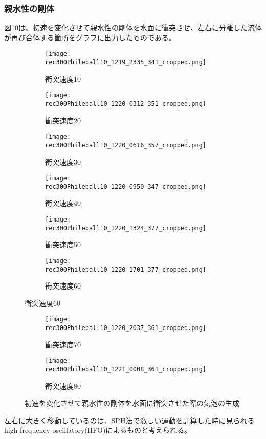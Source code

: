 \documentclass[]{jsarticle}
\begin{document}
\subsubsection{親水性の剛体}
図\ref{fig:hydrophilic}は、初速を変化させて親水性の剛体を水面に衝突させ、左右に分離した流体が再び合体する箇所をグラフに出力したものである。
\begin{figure}[H]
  \centering
\begin{subfigure}{0.3\columnwidth}
  \centering
  \texttt{[image: rec300Phileball10\_1219\_2335\_341\_cropped.png]}
  \caption{衝突速度10}
  \label{fig:philevel10}
\end{subfigure}
\begin{subfigure}{0.3\columnwidth}
  \centering
  \texttt{[image: rec300Phileball10\_1220\_0312\_351\_cropped.png]}
  \caption{衝突速度20}
  \label{fig:philevel20}
\end{subfigure}
\begin{subfigure}{0.3\columnwidth}
  \centering
  \texttt{[image: rec300Phileball10\_1220\_0616\_357\_cropped.png]}
  \caption{衝突速度30}
  \label{fig:philevel30}
\end{subfigure}
\begin{subfigure}{0.3\columnwidth}
  \centering
  \texttt{[image: rec300Phileball10\_1220\_0950\_347\_cropped.png]}
  \caption{衝突速度40}
  \label{fig:philevel40}
\end{subfigure}
\begin{subfigure}{0.3\columnwidth}
  \centering
  \texttt{[image: rec300Phileball10\_1220\_1324\_377\_cropped.png]}
  \caption{衝突速度50}
  \label{fig:philevel50}
\end{subfigure}
\begin{subfigure}{0.3\columnwidth}
  \centering
  \texttt{[image: rec300Phileball10\_1220\_1701\_377\_cropped.png]}
  \caption{衝突速度60}
  \label{fig:philevel60}
\end{subfigure}
\end{figure}
\clearpage
\begin{figure}
\ContinuedFloat
  \begin{subfigure}{0.3\columnwidth}
  \centering
  \texttt{[image: rec300Phileball10\_1220\_2037\_361\_cropped.png]}
  \caption{衝突速度70}
  \label{fig:philevel70}
\end{subfigure}
\begin{subfigure}{0.3\columnwidth}
  \centering
  \texttt{[image: rec300Phileball10\_1221\_0008\_361\_cropped.png]}
  \caption{衝突速度80}
  \label{fig:philevel80}
\end{subfigure}
\caption{初速を変化させて親水性の剛体を水面に衝突させた際の気泡の生成}
\label{fig:hydrophilic}
\end{figure}
左右に大きく移動しているのは、SPH法で激しい運動を計算した時に見られるhigh-frequency oscillatory(HFO)\cite{Kiara2013}によるものと考えられる。
\newpage
\end{document}
